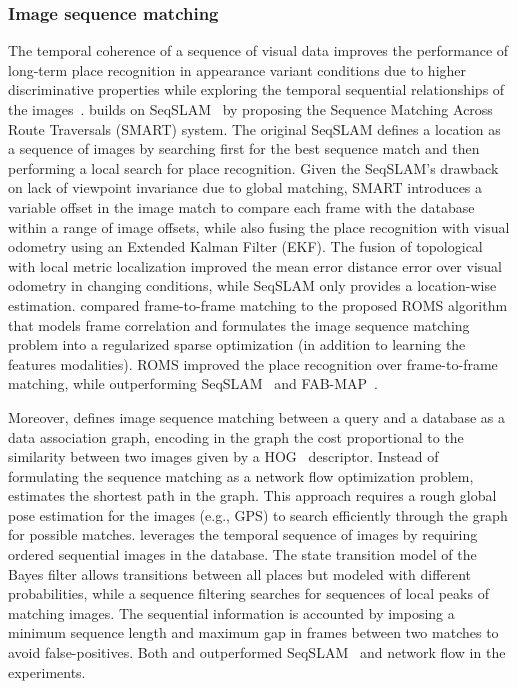 \subsubsection{Image sequence matching}

The temporal coherence of a sequence of visual data improves the performance of long-term place recognition in appearance variant conditions due to higher discriminative properties while exploring the temporal sequential relationships of the images~\parencite{ouerghi-et-al:2018:s18040939,nguyen-et-al:2013:004}.
\cite{ouerghi-et-al:2018:s18040939} builds on SeqSLAM~\parencite{discussion:seqslam} by proposing the Sequence Matching Across Route Traversals (SMART) system. The original SeqSLAM defines a location as a sequence of images by searching first for the best sequence match and then performing a local search for place recognition. Given the SeqSLAM's drawback on lack of viewpoint invariance due to global matching, SMART introduces a variable offset in the image match to compare each frame with the database within a range of image offsets, while also fusing the place recognition with visual odometry using an Extended Kalman Filter (EKF). The fusion of topological with local metric localization improved the mean error distance error over visual odometry in changing conditions, while SeqSLAM only provides a location-wise estimation.
\cite{han-et-al:2018:3} compared frame-to-frame matching to the proposed ROMS algorithm that models frame correlation and formulates the image sequence matching problem into a regularized sparse optimization (in addition to learning the features modalities). ROMS improved the place recognition over frame-to-frame matching, while outperforming SeqSLAM~\parencite{discussion:seqslam} and FAB-MAP~\parencite{discussion:fab-map}.

Moreover, \cite{vysotska-et-al:2015:7139576} defines image sequence matching between a query and a database as a data association graph, encoding in the graph the cost proportional to the similarity between two images given by a HOG~\parencite{original:hog} descriptor. Instead of formulating the sequence matching as a network flow optimization problem, \cite{vysotska-et-al:2015:7139576} estimates the shortest path in the graph. This approach requires a rough global pose estimation for the images (e.g., GPS) to search efficiently through the graph for possible matches.
\cite{naseer-et-al:2015:7324181} leverages the temporal sequence of images by requiring ordered sequential images in the database. The state transition model of the Bayes filter allows transitions between all places but modeled with different probabilities, while a sequence filtering searches for sequences of local peaks of matching images. The sequential information is accounted by imposing a minimum sequence length and maximum gap in frames between two matches to avoid false-positives.
Both \cite{vysotska-et-al:2015:7139576} and \cite{naseer-et-al:2015:7324181} outperformed SeqSLAM~\parencite{discussion:seqslam} and network flow in the experiments.

